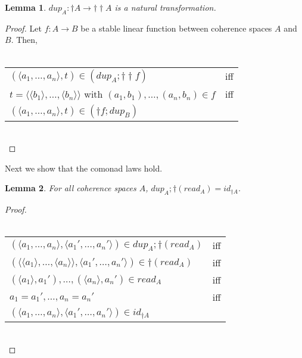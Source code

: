 \documentclass{article}
\newtheorem{lemma}{Lemma}
\begin{document}
\begin{lemma}
$\mathit{dup}_A : \dagger A \to \dagger \dagger A$ is a natural transformation. 
\end{lemma}

\begin{proof}

Let $f : A \to B$ be a stable linear function between coherence spaces $A$ and $B$. Then,\\~\\
\begin{tabular}{ll}
$(\langle a_1,\ldots,a_n \rangle,t) \in (\mathit{dup}_A; \dagger \dagger f)$ & iff \\
$t = \langle \langle b_1 \rangle,\ldots, \langle b_n \rangle \rangle$ with $(a_1,b_1),\ldots,(a_n,b_n) \in f$ & iff \\
$(\langle a_1,\ldots,a_n \rangle,t)  \in (\dagger f; dup_B)$
\end{tabular}~\\

\end{proof}

Next we show that the comonad laws hold.

\begin{lemma}
For all coherence spaces $A$, $\mathit{dup}_A;\dagger(\mathit{read}_A) = \mathit{id}_{\dagger A}$.
\end{lemma}

\begin{proof}~\\~\\
\begin{tabular}{ll}
$(\langle a_1, \ldots, a_n \rangle, \langle a_1', \ldots, a_n' \rangle) \in \mathit{dup}_A;\dagger(\mathit{read}_A)$ & iff \\
$(\langle \langle a_1 \rangle, \ldots, \langle a_n \rangle \rangle, \langle a_1', \ldots, a_n' \rangle) \in \dagger(\mathit{read}_A)$ & iff \\
$(\langle a_1 \rangle, a_1'),\ldots,(\langle a_n \rangle, a_n') \in \mathit{read_A}$ & iff \\
$a_1 = a_1', \ldots, a_n = a_n'$ & iff \\
$(\langle a_1, \ldots, a_n \rangle, \langle a_1', \ldots, a_n' \rangle) \in \mathit{id}_{\dagger A}$
\end{tabular}~\\
\end{proof}
\end{document}
